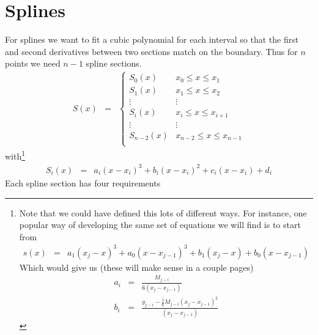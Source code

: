 \section{Splines}
For splines we want to fit a cubic polynomial for each interval so that the first and second derivatives between two sections match on the boundary. Thus for $n$ points we need $n-1$ spline sections.
\begin{eqnarray}
S(x)&=&
\left\{\begin{matrix}
S_0(x) & x_0\leq x\leq x_1 \\
S_1(x) & x_1\leq x\leq x_2 \\
\vdots & \vdots \\
S_i(x) & x_i\leq x\leq x_{i+1} \\
\vdots & \vdots \\
S_{n-2}(x) & x_{n-2}\leq x\leq x_{n-1} \\
\end{matrix}\right.
\end{eqnarray}
with\footnote{Note that we could have defined this lots of different ways.  For instance, one popular way of developing the same set of equations we will find is to start from
\begin{eqnarray}
s(x) & = &
       a_{1}(x_{j}-x)^{3}+a_{0}(x-x_{j-1})^{3}
      +b_{1}(x_{j}-x)+b_{0}(x-x_{j-1})
\end{eqnarray}
Which would give us (these will make sense in a couple pages)
\begin{eqnarray}
a_{i} & = & \frac{M_{j-i}}{6(x_{j}-x_{j-1})} \\
b_{i} & = & \frac{y_{j-i}-\frac{1}{6}M_{j-i}(x_{j}-x_{j-1})^{2}}{(x_{j}-x_{j-1})}
\end{eqnarray}}
\begin{eqnarray}
S_i(x)&=&a_i(x-x_i)^3+b_i(x-x_i)^2+c_i(x-x_i)+d_i
\end{eqnarray}
Each spline section has four requirements
